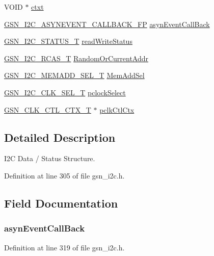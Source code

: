 \begin{DoxyCompactItemize}
\item 
VOID $\ast$ \hyperlink{a00098_ae62f152f1a2f6e8ecad552f10d250166}{ctxt}
\item 
\hyperlink{a00649_gab1a00d4a51461218cbbafc33b29ddd89}{GSN\_\-I2C\_\-ASYNEVENT\_\-CALLBACK\_\-FP} \hyperlink{a00098_accafc47f269761fd2fb402c5d8a973ea}{asynEventCallBack}
\item 
\hyperlink{a00649_ga9787fba32c156c866916dc301e5727c8}{GSN\_\-I2C\_\-STATUS\_\-T} \hyperlink{a00098_ae96954b586843e04b76147a5b69e0d61}{readWriteStatus}
\item 
\hyperlink{a00649_ga3e0976c06462690937465a53a0c38cc4}{GSN\_\-I2C\_\-RCAS\_\-T} \hyperlink{a00098_aec66efdce042263a8ec3b44b5bea07c7}{RandomOrCurrentAddr}
\item 
\hyperlink{a00649_ga3c8e92172b940c58950060ddbccee36d}{GSN\_\-I2C\_\-MEMADD\_\-SEL\_\-T} \hyperlink{a00098_ae558380c5e3a7dceede8655866dceb63}{MemAddSel}
\item 
\hyperlink{a00649_gaced0c2ab1bd7baab4cc105c12ccc1ce0}{GSN\_\-I2C\_\-CLK\_\-SEL\_\-T} \hyperlink{a00098_a1111c14058a32aca1ce149f0a4d9cd5b}{pclockSelect}
\item 
\hyperlink{a00039}{GSN\_\-CLK\_\-CTL\_\-CTX\_\-T} $\ast$ \hyperlink{a00098_a87fd9dda5636bd71a412693b96fed177}{pclkCtlCtx}
\end{DoxyCompactItemize}


\subsection{Detailed Description}
I2C Data / Status Structure. 

Definition at line 305 of file gsn\_\-i2c.h.



\subsection{Field Documentation}
\hypertarget{a00098_accafc47f269761fd2fb402c5d8a973ea}{
\subsubsection[{asynEventCallBack}]{ {\bf asynEventCallBack}}}
\label{a00098_accafc47f269761fd2fb402c5d8a973ea}


Definition at line 319 of file gsn\_\-i2c.h.

